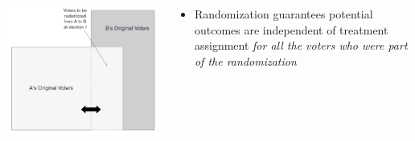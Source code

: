 \documentclass[xcolor=x11names,compress]{beamer}\usepackage[]{graphicx}\usepackage[]{color}
\renewcommand{\(}{\begin{columns}}
\renewcommand{\)}{\end{columns}}
\newcommand{\<}[1]{\begin{column}{#1}}
\renewcommand{\>}{\end{column}}
\begin{document}
\begin{frame}
\begin{columns}
\begin{column}{0.6\textwidth}
\includegraphics[scale=0.34]{Sekhon_redistricting_b.png}
\end{column}
\begin{column}{0.4\textwidth}
\begin{itemize}
\item Randomization guarantees potential outcomes are independent of treatment assignment \textit{for all the voters who were part of the randomization}
\end{itemize}
\end{column}
\end{columns}
\end{frame}
\end{document}
